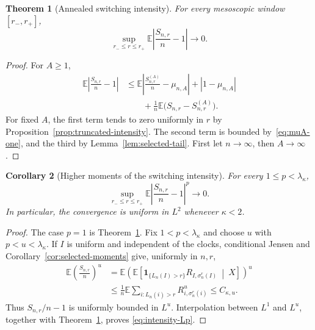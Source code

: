 \documentclass[11pt]{article}
\newcommand{\E}{\mathbb E}
\newcommand{\1}{\mathbf 1}
\newtheorem{theorem}{Theorem}[section]
\newtheorem{corollary}[theorem]{Corollary}
\theoremstyle{definition}
\theoremstyle{remark}
\begin{document}
\begin{theorem}[Annealed switching intensity]
\label{thm:intensity-L1}
For every mesoscopic window $[r_-,r_+]$,
\begin{equation}\label{eq:intensity-L1}
 \sup_{r_-\leq r\leq r_+}
 \E\left|\frac{S_{n,r}}n-1\right|
 \longrightarrow0.
\end{equation}
\end{theorem}

\begin{proof}
For $A\geq1$,
\begin{align*}
 \E\left|\frac{S_{n,r}}n-1\right|
 &\leq
 \E\left|\frac{S_{n,r}^{(A)}}n-\mu_{n,A}\right|
 +|1-\mu_{n,A}|\\
 &\qquad+\frac1n\E\bigl(S_{n,r}-S_{n,r}^{(A)}\bigr).
\end{align*}
For fixed $A$, the first term tends to zero uniformly in $r$ by
Proposition~\ref{prop:truncated-intensity}.  The second term is bounded
by~\eqref{eq:muA-one}, and the third by
Lemma~\ref{lem:selected-tail}.  First let $n\to\infty$, then
$A\to\infty$.
\end{proof}

\begin{corollary}[Higher moments of the switching intensity]
\label{cor:intensity-Lp}
For every $1\leq p<\lambda_\kappa$,
\begin{equation}\label{eq:intensity-Lp}
 \sup_{r_-\leq r\leq r_+}
 \E\left|\frac{S_{n,r}}n-1\right|^p
 \longrightarrow0.
\end{equation}
In particular, the convergence is uniform in $L^2$ whenever
$\kappa<2$.
\end{corollary}

\begin{proof}
The case $p=1$ is Theorem~\ref{thm:intensity-L1}.  Fix
$1<p<\lambda_\kappa$ and choose $u$ with
$p<u<\lambda_\kappa$.  If $I$ is uniform and independent of the clocks,
conditional Jensen and Corollary~\ref{cor:selected-moments} give,
uniformly in $n,r$,
\begin{align*}
 \E\left(\frac{S_{n,r}}n\right)^u
 &=\E\left(
   \E\left[
    \1_{\{L_n(I)>r\}}R_{I,\sigma_n^r(I)}
    \ \middle|\ X
   \right]
  \right)^u\\
 &\leq
 \frac1n\E\sum_{i:L_n(i)>r}R_{i,\sigma_n^r(i)}^u
 \leq C_{\kappa,u}.
\end{align*}
Thus $S_{n,r}/n-1$ is uniformly bounded in $L^u$.  Interpolation between
$L^1$ and $L^u$, together with Theorem~\ref{thm:intensity-L1}, proves
\eqref{eq:intensity-Lp}.
\end{proof}
\end{document}
